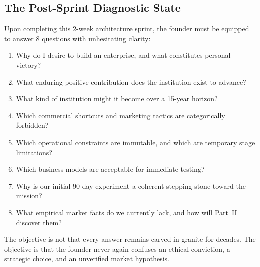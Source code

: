 \subsection{The Post-Sprint Diagnostic State}

Upon completing this 2-week architecture sprint, the founder must be equipped to answer 8 questions with unhesitating clarity:

\begin{enumerate}[leftmargin=12pt,itemsep=2pt,topsep=1pt,parsep=0pt]
  \item Why do I desire to build an enterprise, and what constitutes personal victory?
  \item What enduring positive contribution does the institution exist to advance?
  \item What kind of institution might it become over a 15-year horizon?
  \item Which commercial shortcuts and marketing tactics are categorically forbidden?
  \item Which operational constraints are immutable, and which are temporary stage limitations?
  \item Which business models are acceptable for immediate testing?
  \item Why is our initial 90-day experiment a coherent stepping stone toward the mission?
  \item What empirical market facts do we currently lack, and how will Part~II discover them?
\end{enumerate}

The objective is not that every answer remains carved in granite for decades. The objective is that the founder never again confuses an ethical conviction, a strategic choice, and an unverified market hypothesis.
